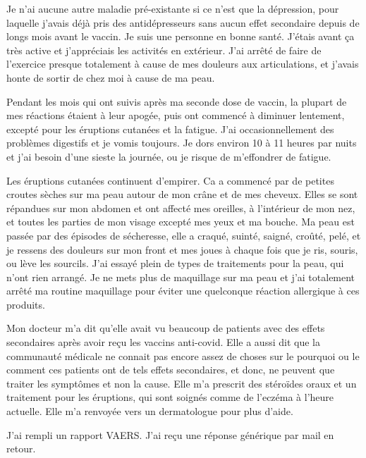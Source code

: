Je n'ai aucune autre maladie pré-existante si ce n'est que la dépression, pour
laquelle j'avais déjà pris des antidépresseurs sans aucun effet secondaire
depuis de longs mois avant le vaccin. Je suis une personne en bonne
santé. J'étais avant ça très active et j'appréciais les activités en
extérieur. J'ai arrêté de faire de l'exercice presque totalement à cause de mes
douleurs aux articulations, et j'avais honte de sortir de chez moi à cause de ma
peau.

Pendant les mois qui ont suivis après ma seconde dose de vaccin, la plupart de
mes réactions étaient à leur apogée, puis ont commencé à diminuer lentement,
excepté pour les éruptions cutanées et la fatigue. J'ai occasionnellement des
problèmes digestifs et je vomis toujours. Je dors environ 10 à 11 heures par
nuits et j'ai besoin d'une sieste la journée, ou je risque de m'effondrer de
fatigue.

Les éruptions cutanées continuent d'empirer. Ca a commencé par de petites
croutes sèches sur ma peau autour de mon crâne et de mes cheveux. Elles se sont
répandues sur mon abdomen et ont affecté mes oreilles, à l'intérieur de mon nez,
et toutes les parties de mon visage excepté mes yeux et ma bouche. Ma peau est
passée par des épisodes de sécheresse, elle a craqué, suinté, saigné, croûté,
pelé, et je ressens des douleurs sur mon front et mes joues à chaque fois que je
ris, souris, ou lève les sourcils. J'ai essayé plein de types de traitements
pour la peau, qui n'ont rien arrangé. Je ne mets plus de maquillage sur ma peau
et j'ai totalement arrêté ma routine maquillage pour éviter une quelconque
réaction allergique à ces produits.

Mon docteur m'a dit qu'elle avait vu beaucoup de patients avec des effets
secondaires après avoir reçu les vaccins anti-covid. Elle a aussi dit que la
communauté médicale ne connait pas encore assez de choses sur le pourquoi ou le
comment ces patients ont de tels effets secondaires, et donc, ne peuvent que
traiter les symptômes et non la cause. Elle m'a prescrit des stéroïdes oraux et
un traitement pour les éruptions, qui sont soignés comme de l'eczéma à l'heure
actuelle. Elle m'a renvoyée vers un dermatologue pour plus d'aide.

J'ai rempli un rapport VAERS. J'ai reçu une réponse générique par mail en retour.

